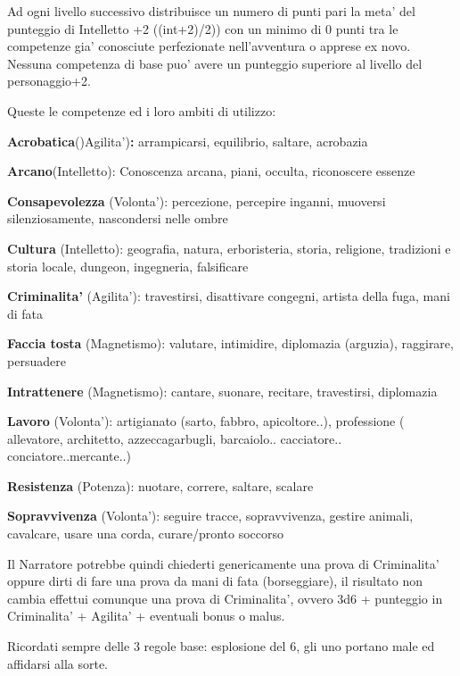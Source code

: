 \documentclass[a4paper,11pt,twoside,openany]{book}
\begin{document}
Ad ogni livello successivo distribuisce un numero di punti pari la meta' del punteggio di Intelletto +2 ((int+2)/2)) con un minimo di 0 punti tra le competenze gia' conosciute perfezionate nell'avventura o apprese ex novo. Nessuna competenza di base puo' avere un  punteggio superiore al livello del personaggio+2.

\bigskip

Queste le competenze ed i loro ambiti di utilizzo:

\textbf{Acrobatica}()Agilita')\textbf{:} arrampicarsi, equilibrio, saltare, acrobazia

\textbf{Arcano}(Intelletto): Conoscenza arcana, piani, occulta, riconoscere essenze

\textbf{Consapevolezza} (Volonta'): percezione, percepire inganni, muoversi silenziosamente, nascondersi nelle ombre

\textbf{Cultura} (Intelletto): geografia, natura, erboristeria, storia, religione, tradizioni e storia locale, dungeon, ingegneria, falsificare

\textbf{Criminalita'} (Agilita'): travestirsi, disattivare congegni, artista della fuga, mani di fata

\textbf{Faccia tosta} (Magnetismo): valutare, intimidire, diplomazia (arguzia), raggirare, persuadere

\textbf{Intrattenere} (Magnetismo): cantare, suonare, recitare, travestirsi, diplomazia

\textbf{Lavoro} (Volonta'): artigianato (sarto, fabbro, apicoltore..), professione ( allevatore, architetto, azzeccagarbugli, barcaiolo.. cacciatore.. conciatore..mercante..)

\textbf{Resistenza} (Potenza): nuotare, correre, saltare, scalare

\textbf{Sopravvivenza} (Volonta'): seguire tracce, sopravvivenza, gestire animali, cavalcare, usare una corda, curare/pronto soccorso

\bigskip

Il Narratore potrebbe quindi chiederti genericamente una prova di Criminalita' oppure dirti di fare una prova da mani di fata (borseggiare), il risultato non cambia effettui comunque una prova di Criminalita', ovvero 3d6 + punteggio in Criminalita' + Agilita' + eventuali bonus
o malus.

Ricordati sempre delle 3 regole base: esplosione del 6, gli uno portano male ed affidarsi alla sorte.
\end{document}
